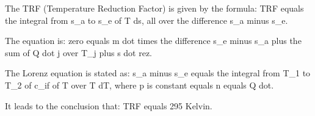 The TRF (Temperature Reduction Factor) is given by the formula:
TRF equals the integral from s_a to s_e of T ds, all over the difference s_a minus s_e.

The equation is:
zero equals m dot times the difference s_e minus s_a plus the sum of Q dot j over T_j plus s dot rez.

The Lorenz equation is stated as:
s_a minus s_e equals the integral from T_1 to T_2 of c_if of T over T dT, where p is constant equals n equals Q dot.

It leads to the conclusion that:
TRF equals 295 Kelvin.